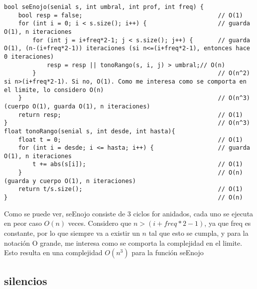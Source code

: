 \documentclass{article}
\begin{document}
\begin{lstlisting}
bool seEnojo(senial s, int umbral, int prof, int freq) {
    bool resp = false;                                      // O(1)
    for (int i = 0; i < s.size(); i++) {                    // guarda O(1), n iteraciones
        for (int j = i+freq*2-1; j < s.size(); j++) {       // guarda O(1), (n-(i+freq*2-1)) iteraciones (si n<=(i+freq*2-1), entonces hace 0 iteraciones)
            resp = resp || tonoRango(s, i, j) > umbral;// O(n)
        }                                                   // O(n^2) si n>(i+freq*2-1). Si no, O(1). Como me interesa como se comporta en el limite, lo considero O(n)
    }                                                       // O(n^3) (cuerpo O(1), guarda O(1), n iteraciones)
    return resp;                                            // O(1)
}                                                           // O(n^3)
float tonoRango(senial s, int desde, int hasta){
    float t = 0;                                            // O(1)
    for (int i = desde; i <= hasta; i++) {                  // guarda O(1), n iteraciones
        t += abs(s[i]);                                     // O(1)
    }                                                       // O(n) (guarda y cuerpo O(1), n iteraciones)
    return t/s.size();                                      // O(1)
}                                                           // O(n)
\end{lstlisting}

Como se puede ver, seEnojo consiste de 3 ciclos for anidados, cada uno se ejecuta en peor caso $O(n)$ veces.
Considero que $n>(i+freq*2-1)$, ya que freq es constante, por lo que siempre va a existir un $n$ tal que esto se cumpla,
y para la notación O grande, me interesa como se comporta la complejidad en el limite.
Esto resulta en una complejidad $O(n^3)$ para la función seEnojo

\newpage
\subsection{silencios}
\end{document}
